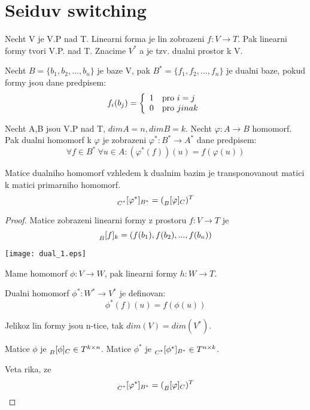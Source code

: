 \section{\texorpdfstring{Seiduv switching}{Seiduv switching}}
\vspace{5mm}
\large


\begin{definition}
Necht V je V.P nad T. Linearni forma je lin zobrazeni $f:V \to T$. Pak linearni formy tvori V.P. nad T. Znacime $V^{\ast}$ a je tzv. dualni prostor k V.
\end{definition}
\begin{definition}
Necht $B = \{b_1, b_2, ..., b_n\}$ je baze V, pak $B^{\ast} = \{ f_1, f_2, ..., f_n \}$ je dualni baze, pokud formy jsou dane predpisem:
\[ f_i(b_j)= \left\{ \begin{array}{ll} 1 & \mbox{pro } i = j \\ 0 & \mbox{pro } jinak \end{array} \right. \]
\end{definition}
\begin{definition}
Necht A,B jsou V.P nad T, $dimA = n, dimB = k$. Necht $\varphi:A \to B$ homomorf. Pak dualni homomorf k $\varphi$ je zobrazeni $\varphi^{\ast}: B^{\ast} \to A^{\ast}$ dane predpisem:
\[ \forall f \in B^{\ast}\  \forall u \in A: (\varphi^{\ast}(f))(u) = f(\varphi(u)) \]
\end{definition}


\begin{theorem}
Matice dualniho homomorf vzhledem k dualnim bazim je transponovanout matici k matici primarniho homomorf.
\[ \prescript{}{C^{\ast}}{[\varphi^{\ast}]}_{B^{\ast}} = (\prescript{}{B}{[\varphi]}_{C})^T \]
\end{theorem}
\begin{proof}
	Matice zobrazeni linearni formy z prostoru $f:V \to T$ je
	\[ \prescript{}{B}{[f]}_{k} = (f(b_1), f(b_2),...,f(b_n)) \]

	\texttt{[image: dual\_1.eps]}

	Mame homomorf $\phi:V \to W$, pak linearni formy $h:W \to T$.

	Dualni homomorf $\phi^{\ast}:W^{\ast} \to V^{\ast}$ je definovan:
	\[ \phi^{\ast}(f)(u) = f(\phi(u)) \]

	Jelikoz lin formy jsou n-tice, tak $dim(V) = dim(V^{\ast})$.

	Matice $\phi$ je $\prescript{}{B}{[\phi]}_{C} \in T^{k \times n}$.
	Matice $\phi^{\ast}$ je $\prescript{}{C^{\ast}}{[\phi^{\ast}]}_{B^{\ast}} \in T^{n \times k}$.

	Veta rika, ze
	\[ \prescript{}{C^{\ast}}{[\varphi^{\ast}]}_{B^{\ast}} = (\prescript{}{B}{[\varphi]}_{C})^T \]
\end{proof}

